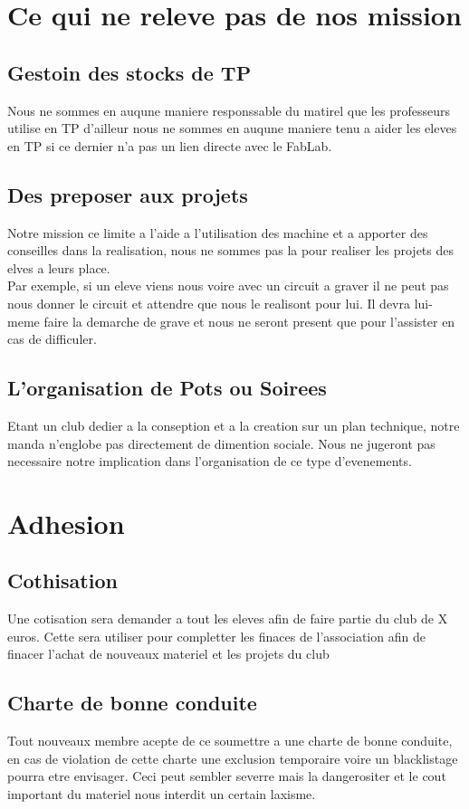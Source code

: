 \documentclass[12pt,a4paper]{article}
\begin{document}
\section{Ce qui ne releve pas de nos mission}
\subsection{Gestoin des stocks de TP}
Nous ne sommes en auqune maniere responssable du matirel que les professeurs utilise en TP d'ailleur nous ne sommes en auqune maniere tenu a aider les eleves en TP si ce dernier n'a pas un lien directe avec le FabLab. 
\subsection{Des preposer aux projets}
Notre mission ce limite a l'aide a l'utilisation des machine et a apporter des conseilles dans la realisation, nous ne sommes pas la pour realiser les projets des elves a leurs place. \\
Par exemple, si un eleve viens nous voire avec un circuit a graver il ne peut pas nous donner le circuit et attendre que nous le realisont pour lui. Il devra lui-meme faire la demarche de grave et nous ne seront present que pour l'assister en cas de difficuler.
\subsection{L'organisation de Pots ou Soirees}
Etant un club dedier a la conseption et a la creation sur un plan technique, notre manda n'englobe pas directement de dimention sociale. Nous ne jugeront pas necessaire notre implication dans l'organisation de ce type d'evenements.
\section{Adhesion}
\subsection{Cothisation}Une cotisation sera demander a tout les eleves afin de faire partie du club de X euros. Cette sera utiliser pour completter les finaces de l'association afin de finacer l'achat de nouveaux materiel et les projets du club%
\subsection{Charte de bonne conduite}
Tout nouveaux membre acepte de ce soumettre a une charte de bonne conduite, en cas de violation de cette charte une exclusion temporaire voire un blacklistage pourra etre envisager. Ceci peut sembler severre mais la dangerositer et le cout important du materiel nous interdit un certain laxisme.
\end{document}
